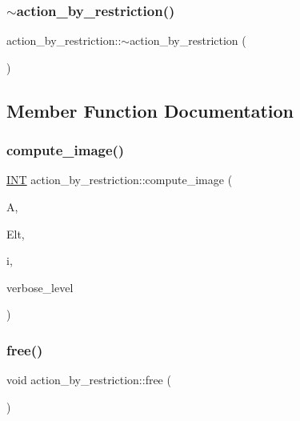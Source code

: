 \subsubsection{\texorpdfstring{$\sim$action\+\_\+by\+\_\+restriction()}{~action\_by\_restriction()}}
{\footnotesize\ttfamily action\+\_\+by\+\_\+restriction\+::$\sim$action\+\_\+by\+\_\+restriction (\begin{DoxyParamCaption}{ }\end{DoxyParamCaption})}



\subsection{Member Function Documentation}
\mbox{\label{classaction__by__restriction_a2d669c0f0b3905fb5effc983c9fbb0cc}} 
\subsubsection{\texorpdfstring{compute\+\_\+image()}{compute\_image()}}
{\footnotesize\ttfamily \mbox{\hyperlink{galois_8h_a09fddde158a3a20bd2dcadb609de11dc}{I\+NT}} action\+\_\+by\+\_\+restriction\+::compute\+\_\+image (\begin{DoxyParamCaption}\item[{\mbox{\hyperlink{classaction}{action}} $\ast$}]{A,  }\item[{\mbox{\hyperlink{galois_8h_a09fddde158a3a20bd2dcadb609de11dc}{I\+NT}} $\ast$}]{Elt,  }\item[{\mbox{\hyperlink{galois_8h_a09fddde158a3a20bd2dcadb609de11dc}{I\+NT}}}]{i,  }\item[{\mbox{\hyperlink{galois_8h_a09fddde158a3a20bd2dcadb609de11dc}{I\+NT}}}]{verbose\+\_\+level }\end{DoxyParamCaption})}

\mbox{\label{classaction__by__restriction_a0635c562fbf754d8230ed1d8e5e32719}} 
\subsubsection{\texorpdfstring{free()}{free()}}
{\footnotesize\ttfamily void action\+\_\+by\+\_\+restriction\+::free (\begin{DoxyParamCaption}{ }\end{DoxyParamCaption})}

